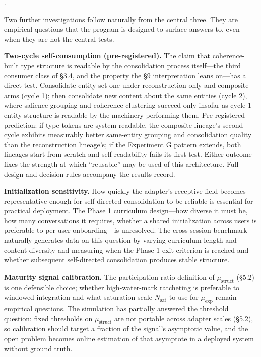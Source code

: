\documentclass[11pt]{article}
\begin{document}
\cite{lin2025sparse, biderman2024}.

Two further investigations follow naturally from the central three. They are empirical questions that the program is designed to surface answers to, even when they are not the central tests.

\textbf{Two-cycle self-consumption (pre-registered).} The claim that coherence-built type structure is readable by the consolidation process itself---the third consumer class of \S 3.4, and the property the \S 9 interpretation leans on---has a direct test. Consolidate entity set one under reconstruction-only and composite arms (cycle 1); then consolidate new content about the same entities (cycle 2), where salience grouping and coherence clustering succeed only insofar as cycle-1 entity structure is readable by the machinery performing them. Pre-registered prediction: if type tokens are system-readable, the composite lineage's second cycle exhibits measurably better same-entity grouping and consolidation quality than the reconstruction lineage's; if the Experiment G pattern extends, both lineages start from scratch and self-readability fails its first test. Either outcome fixes the strength at which ``reusable'' may be used of this architecture. Full design and decision rules accompany the results record.

\textbf{Initialization sensitivity.} How quickly the adapter's receptive field becomes representative enough for self-directed consolidation to be reliable is essential for practical deployment. The Phase 1 curriculum design---how diverse it must be, how many conversations it requires, whether a shared initialization across users is preferable to per-user onboarding---is unresolved. The cross-session benchmark naturally generates data on this question by varying curriculum length and content diversity and measuring when the Phase 1 exit criterion is reached and whether subsequent self-directed consolidation produces stable structure.

\textbf{Maturity signal calibration.} The participation-ratio definition of $\mu_\text{struct}$ (\S 5.2) is one defensible choice; whether high-water-mark ratcheting is preferable to windowed integration and what saturation scale $N_\text{sat}$ to use for $\mu_\text{exp}$ remain empirical questions. The simulation has partially answered the threshold question: fixed thresholds on $\mu_\text{struct}$ are not portable across adapter scales (\S 5.2), so calibration should target a fraction of the signal's asymptotic value, and the open problem becomes online estimation of that asymptote in a deployed system without ground truth.
\end{document}
